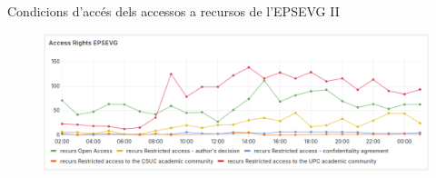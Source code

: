 \begin{frame}{Condicions d'accés dels accessos a recursos de l'EPSEVG II}
    \begin{figure}
        \includegraphics[width=\textwidth]{figures/access-rights-epsevg}
        \label{fig:use-case-3}
    \end{figure}
\end{frame}
